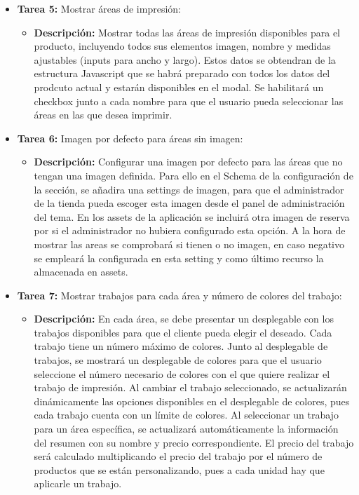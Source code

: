\documentclass[11pt]{article}
\begin{document}
\begin{itemize}
\begin{itemize}[label=--]
          \end{itemize}
    \item \textbf{Tarea 5:} Mostrar áreas de impresión:
          \begin{itemize}[label=--]
              \item \textbf{Descripción:} Mostrar todas las áreas de impresión disponibles para el producto, incluyendo todos sus elementos imagen, nombre y medidas ajustables (inputs para ancho y largo). Estos datos se obtendran de la estructura Javascript que se habrá preparado con todos los datos del prodcuto actual y estarán disponibles en el modal. Se habilitará un checkbox junto a cada nombre para que el usuario pueda seleccionar las áreas en las que desea imprimir.
          \end{itemize}
    \item \textbf{Tarea 6:} Imagen por defecto para áreas sin imagen:
          \begin{itemize}[label=--]
              \item \textbf{Descripción:} Configurar una imagen por defecto para las áreas que no tengan una imagen definida. Para ello en el Schema de la configuración de la sección, se añadira una settings de imagen, para que el administrador de la tienda pueda escoger esta imagen desde el panel de administración del tema. En los assets de la aplicación se incluirá otra imagen de reserva por si el administrador no hubiera configurado esta opción. A la hora de mostrar las areas se comprobará si tienen o no imagen, en caso negativo se empleará la configurada en esta setting y como último recurso la almacenada en assets.
          \end{itemize}
    \item \textbf{Tarea 7:} Mostrar trabajos para cada área y número de colores del trabajo:
          \begin{itemize}[label=--]
              \item \textbf{Descripción:} En cada área, se debe presentar un desplegable con los trabajos disponibles para que el cliente pueda elegir el deseado. Cada trabajo tiene un número máximo de colores. Junto al desplegable de trabajos, se mostrará un desplegable de colores para que el usuario seleccione el número necesario de colores con el que quiere realizar el trabajo de impresión. Al cambiar el trabajo seleccionado, se actualizarán dinámicamente las opciones disponibles en el desplegable de colores, pues cada trabajo cuenta con un límite de colores. Al seleccionar un trabajo para un área específica, se actualizará automáticamente la información del resumen con su nombre y precio correspondiente. El precio del trabajo será calculado multiplicando el precio del trabajo por el número de productos que se están personalizando, pues a cada unidad hay que aplicarle un trabajo.

\end{itemize}
\end{itemize}
\end{document}
